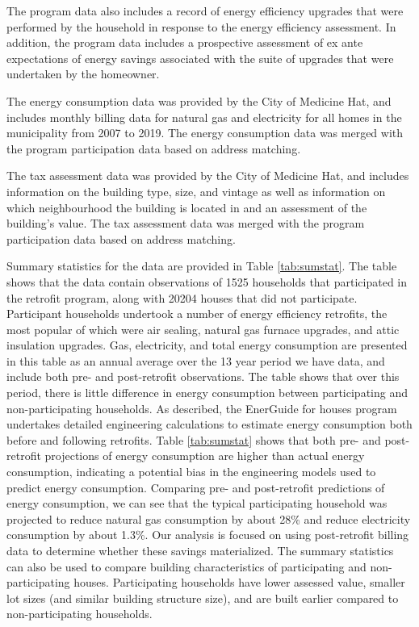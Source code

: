 \documentclass{article}
\begin{document}
The program data also includes a record of energy efficiency upgrades that were performed by the household in response to the energy efficiency assessment. In addition, the program data includes a prospective assessment of ex ante expectations of energy savings associated with the suite of upgrades that were undertaken by the homeowner.

The energy consumption data was provided by the City of Medicine Hat, and includes monthly billing data for natural gas and electricity for all homes in the municipality from 2007 to 2019.  The energy consumption data was merged with the program participation data based on address matching.

The tax assessment data was provided by the City of Medicine Hat, and includes information on the building type, size, and vintage as well as information on which neighbourhood the building is located in and an assessment of the building's value. The tax assessment data was merged with the program participation data based on address matching.

Summary statistics for the data are provided in Table \ref{tab:sumstat}. The table shows that the data contain observations of 1525 households that participated in the retrofit program, along with 20204 houses that did not participate.  Participant households undertook a number of energy efficiency retrofits, the most popular of which were air sealing, natural gas furnace upgrades, and attic insulation upgrades.  Gas, electricity, and total energy consumption are presented in this table as an annual average over the 13 year period we have data, and include both pre- and post-retrofit observations. The table shows that over this period, there is little difference in energy consumption between participating and non-participating households. As described, the EnerGuide for houses program undertakes detailed engineering calculations to estimate energy consumption both before and following retrofits. Table \ref{tab:sumstat} shows that both pre- and post-retrofit projections of energy consumption are higher than actual energy consumption, indicating a potential bias in the engineering models used to predict energy consumption. Comparing pre- and post-retrofit predictions of energy consumption, we can see that the typical participating household was projected to reduce natural gas consumption by about 28\% and reduce electricity consumption by about 1.3\%. Our analysis is focused on using post-retrofit billing data to determine whether these savings materialized.  The summary statistics can also be used to compare building characteristics of participating and non-participating houses. Participating households have lower assessed value, smaller lot sizes (and similar building structure size), and are built earlier compared to non-participating households.
\end{document}
